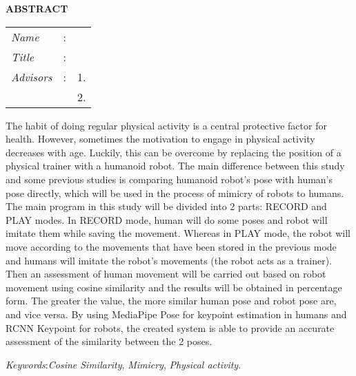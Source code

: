 \begin{center}
  \large\textbf{ABSTRACT}
\end{center}


\vspace{2ex}

\begingroup
\setlength{\tabcolsep}{0pt}

\noindent
\begin{tabularx}{\textwidth}{l >{\centering}m{3em} X}
  \emph{Name}     & : & \name{}         \\

  \emph{Title}    & : & \engtatitle{}   \\

  \emph{Advisors} & : & 1. \advisor{}   \\
                  &   & 2. \coadvisor{} \\
\end{tabularx}
\endgroup

The habit of doing regular physical activity is a central protective factor for health.
However, sometimes the motivation to engage in physical activity decreases with age.
Luckily, this can be overcome by replacing the position of a physical trainer with a humanoid robot.
The main difference between this study and some previous studies is comparing humanoid robot's pose with human's pose directly, 
which will be used in the process of mimicry of robots to humans.
The main program in this study will be divided into 2 parts: RECORD and PLAY modes. In RECORD mode, human will do some poses and robot will imitate them
while saving the movement. Whereas in PLAY mode, the robot will move according to the movements that have been stored in the previous mode and humans will imitate the robot's movements (the robot acts as a trainer).
Then an assessment of human movement will be carried out based on robot movement using cosine similarity and the results will be obtained in percentage form.
The greater the value, the more similar human pose and robot pose are, and vice versa.
By using MediaPipe Pose for keypoint estimation in humans and RCNN Keypoint for robots, the created system is able to provide an accurate assessment of the similarity between the 2 poses.

\emph{Keywords}:\emph{Cosine Similarity}, \emph{Mimicry}, \emph{Physical activity}.

